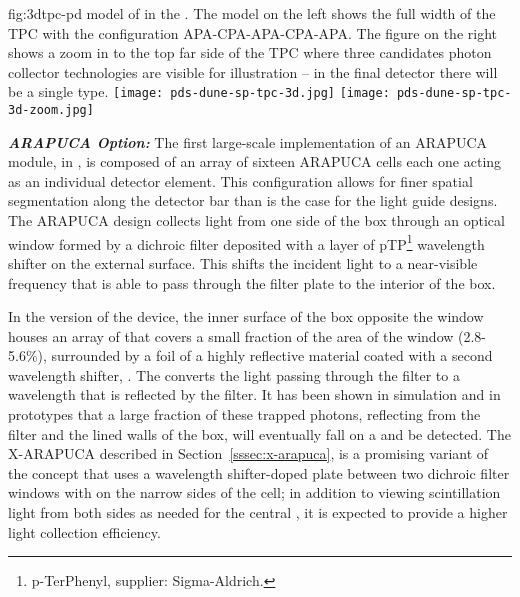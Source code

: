 \begin{dunefigure}{fig:3dtpc-pd}
{\threed model of  in the . The model on the left shows the full width of the TPC with the configuration APA-CPA-APA-CPA-APA. The figure on the right shows a zoom in to the top far side of the TPC where three candidates photon collector technologies are visible for illustration -- in the final detector there will be a single type.}
\texttt{[image: pds-dune-sp-tpc-3d.jpg]}
\texttt{[image: pds-dune-sp-tpc-3d-zoom.jpg]}
\end{dunefigure}


\textit{\bf ARAPUCA Option:} The first large-scale implementation of an ARAPUCA module, in , is composed of an array of sixteen ARAPUCA cells each one acting as an individual detector element. This configuration allows for finer spatial segmentation along the detector bar than is the case for the light guide designs. 
The  ARAPUCA design collects light from one side of the box through an optical window formed  
by a dichroic filter deposited with a layer of pTP\footnote{p-TerPhenyl,  supplier: Sigma-Aldrich\textregistered.}
wavelength shifter on the external surface. This shifts the incident  light to a near-visible frequency that is able to pass through the filter plate to the interior of the box.  

In the  version of the device, the inner surface of the box opposite the window houses an array of  that covers a small fraction of the area of the window (2.8-5.6\%), surrounded by a foil of a highly reflective material coated with a second wavelength shifter, . The 
converts the light passing through the filter to a wavelength that is reflected by the filter. It has been shown in simulation and in prototypes that a large fraction of these trapped photons, reflecting from the filter and the lined walls of the box, will eventually fall on a  and be detected.
The X-ARAPUCA described in Section~\ref{sssec:x-arapuca}, is a promising variant of the concept that uses a wavelength shifter-doped plate between two dichroic filter windows with  on the narrow sides of the cell; in addition to viewing scintillation light from both sides as needed for the central , it is expected to provide a higher light collection efficiency.

